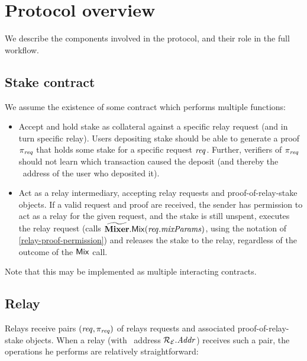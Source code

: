 \section{Protocol overview}\label{relay-stake:protocol-overview}

We describe the components involved in the protocol, and their role in the full workflow.

\subsection{Stake contract}

We assume the existence of some contract \stakecontract{} which performs multiple functions:
\begin{itemize}
\item Accept and hold stake as collateral against a specific relay request (and in turn specific relay). Users depositing stake should be able to generate a proof $\pi_{\mathtt{\mathit{req}}}$ that \stakecontract{} holds some stake for a specific request $\mathit{req}$. Further, verifiers of $\pi_{\mathtt{\mathit{req}}}$ should not learn which transaction caused the deposit (and thereby the \ethereum~address of the user who deposited it).
\item Act as a relay intermediary, accepting relay requests and proof-of-relay-stake objects. If a valid request and proof are received, the sender has permission to act as a relay for the given request, and the stake is still unspent, \stakecontract{} executes the relay request (calls $\widetilde{\mathbf{Mixer}}{}.\mathsf{Mix}(\mathit{req}.\mathit{mixParams})$, using the notation of \cref{relay-proof-permission}) and releases the stake to the relay, regardless of the outcome of the $\mathsf{Mix}{}$ call.
\end{itemize}
Note that this may be implemented as multiple interacting contracts.

\subsection{Relay}

Relays receive pairs $(\mathit{req}, \pi_{\mathtt{\mathit{req}}})$ of relays requests and associated proof-of-relay-stake objects. When a relay \relayP{} (with \ethereum~address $\mathcal{{R}_{E}}.\mathit{Addr}$) receives such a pair, the operations he performs are relatively straightforward:

